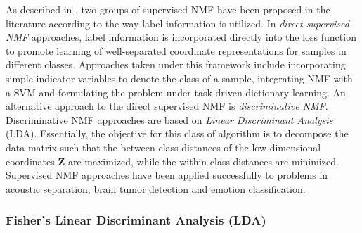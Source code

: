 As described in \citep{Chao2019RecentAdvancesSupervisedDimRed}, two groups of supervised NMF have been proposed in the literature according to the way label information is utilized.  In \textit{direct supervised NMF} approaches, label information is incorporated directly into the loss function to promote learning of well-separated coordinate representations for samples in different classes.  Approaches taken under this framework include incorporating simple indicator variables to denote the class of a sample, integrating NMF with a SVM and formulating the problem under task-driven dictionary learning.  An alternative approach to the direct supervised NMF is \textit{discriminative NMF}.  Discriminative NMF approaches are based on \textit{Linear Discriminant Analysis} (LDA).  Essentially, the objective for this class of algorithm is to decompose the data matrix such that the between-class distances of the low-dimensional coordinates $\bm{Z}$ are maximized, while the within-class distances are minimized.  Supervised NMF approaches have been applied successfully to problems in acoustic separation, brain tumor detection and emotion classification.




\subsubsection{Fisher's Linear Discriminant Analysis (LDA)} \label{sec:LDA}

